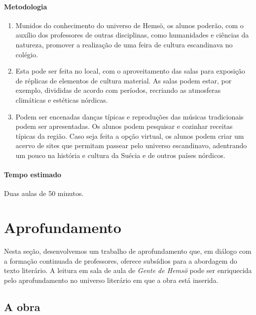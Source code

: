 \documentclass[12pt]{extarticle}
\begin{document}
\paragraph{Metodologia}

\begin{enumerate}

\item
Munidos do conhecimento do universo de Hemsö, os alunos
poderão, com o auxílio dos professores de outras disciplinas, 
como humanidades e ciências da natureza, 
promover a realização de uma feira de cultura escandinava no colégio. 

\item
Esta pode ser feita no local, com o aproveitamento das salas para exposição 
de réplicas de elementos de cultura material. As salas podem estar, por 
exemplo, divididas de acordo com períodos, recriando as atmosferas 
climáticas e estéticas nórdicas.

\item
Podem ser encenadas danças típicas e reproduções das músicas tradicionais 
podem ser apresentadas. Os alunos podem pesquisar e cozinhar receitas 
típicas da região. Caso seja feita a opção virtual, os alunos podem criar 
um acervo de sites que permitam passear pelo universo escandinavo, 
adentrando um pouco na história e cultura da Suécia e de outros países 
nórdicos.

\end{enumerate}

\paragraph{Tempo estimado} Duas aulas de 50 minutos.


\section{Aprofundamento}

Nesta seção, desenvolvemos um trabalho de aprofundamento que, em diálogo
com a formação continuada de professores, oferece subsídios para a
abordagem do texto literário. A leitura em sala de aula de \emph{Gente
de Hemsö} pode ser enriquecida pelo aprofundamento no universo literário
em que a obra está inserida.

\subsection{A obra}
\end{document}
